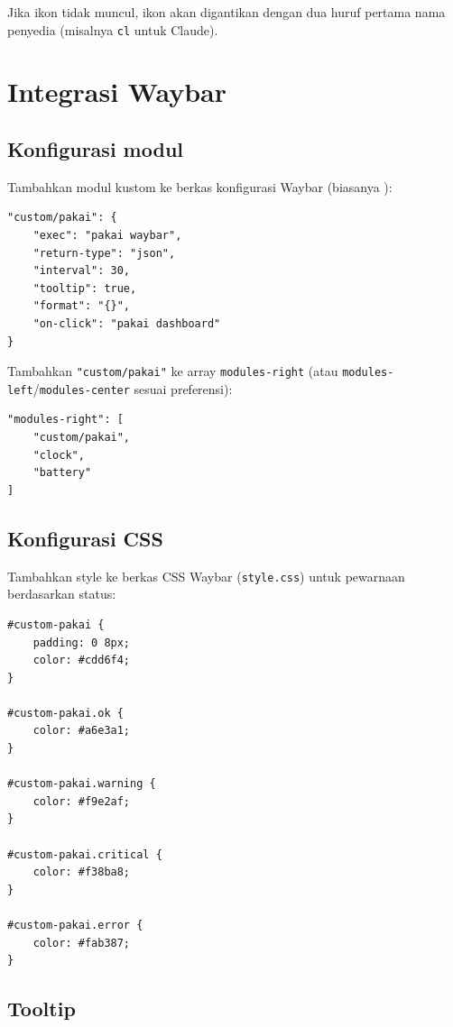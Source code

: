 Jika ikon tidak muncul, ikon akan digantikan dengan dua huruf pertama nama
penyedia (misalnya \texttt{cl} untuk Claude).

\section{Integrasi Waybar}

\subsection{Konfigurasi modul}

Tambahkan modul kustom ke berkas konfigurasi Waybar (biasanya
):

\begin{lstlisting}[style=toml]
"custom/pakai": {
    "exec": "pakai waybar",
    "return-type": "json",
    "interval": 30,
    "tooltip": true,
    "format": "{}",
    "on-click": "pakai dashboard"
}
\end{lstlisting}

\begin{sloppypar}
Tambahkan \texttt{"custom/pakai"} ke array \texttt{modules-right} (atau
\texttt{modules-left}/\texttt{modules-center} sesuai preferensi):
\end{sloppypar}

\begin{lstlisting}[style=toml]
"modules-right": [
    "custom/pakai",
    "clock",
    "battery"
]
\end{lstlisting}

\subsection{Konfigurasi CSS}

Tambahkan style ke berkas CSS Waybar (\texttt{style.css}) untuk
pewarnaan berdasarkan status:

\begin{lstlisting}[style=toml]
#custom-pakai {
    padding: 0 8px;
    color: #cdd6f4;
}

#custom-pakai.ok {
    color: #a6e3a1;
}

#custom-pakai.warning {
    color: #f9e2af;
}

#custom-pakai.critical {
    color: #f38ba8;
}

#custom-pakai.error {
    color: #fab387;
}
\end{lstlisting}

\subsection{Tooltip}


